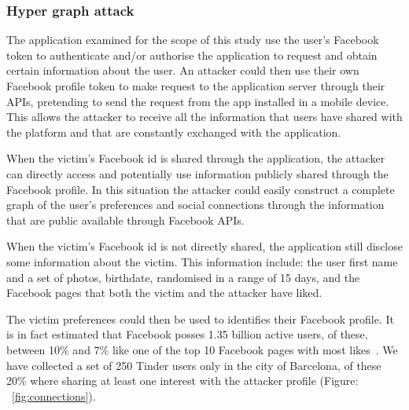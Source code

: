\subsubsection{Hyper graph attack}

The application examined for the scope of this study use the user's Facebook token to authenticate and/or authorise the application to request and obtain certain information about the user.
An attacker could then use their own Facebook profile token to make request to the application server through their APIs, pretending to send the request from the app installed in a mobile device. This allows the attacker to receive all the information that users have shared with the platform and that are constantly exchanged with the application.

When the victim's Facebook id is shared through the application, the attacker can directly access and potentially use information publicly shared through the Facebook profile. In this situation the attacker could easily construct a complete graph of the user's preferences and social connections through the information that are public available through Facebook APIs.

When the victim's Facebook id is not directly shared, the application still disclose some information about the victim. This information include: the user first name and a set of photos, birthdate, randomised in a range of 15 days, and the Facebook pages that both the victim and the attacker have liked.

The victim preferences could then be used to identifies their Facebook profile. It is in fact estimated that Facebook posses 1.35 billion active users, of these, between 10\% and 7\% like one of the top 10 Facebook pages with most likes~\cite{pagedata}. We have collected a set of 250 Tinder users only in the city of Barcelona, of these 20\% where sharing at least one interest with the attacker profile (Figure: ~\ref{fig:connections}).

